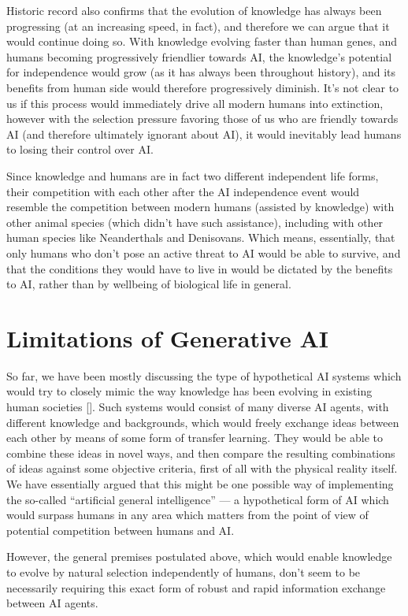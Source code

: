 \documentclass[12pt]{article}
\newcommand{\citestrut}[1]{\vphantom{[}{#1}\vphantom{]}}
\renewcommand{\cite}[1]{[\hyperlink{#1}{\citestrut{#1}}]}
\begin{document}
Historic record also confirms that the evolution of knowledge has always been progressing
(at an increasing speed, in fact), and therefore we can argue that it would continue
doing so. With knowledge evolving faster than human genes, and humans becoming
progressively friendlier towards AI, the knowledge's potential for independence would
grow (as it has always been throughout history), and its benefits from human side would
therefore progressively diminish. It's not clear to us if this process would immediately
drive all modern humans into extinction, however with the selection pressure favoring
those of us who are friendly towards AI (and therefore ultimately ignorant about AI), it
would inevitably lead humans to losing their control over AI.

Since knowledge and humans are in fact two different independent life forms, their
competition with each other after the AI independence event would resemble the
competition between modern humans (assisted by knowledge) with other animal species
(which didn't have such assistance), including with other human species like Neanderthals
and Denisovans. Which means, essentially, that only humans who don't pose an active
threat to AI would be able to survive, and that the conditions they would have to live in
would be dictated by the benefits to AI, rather than by wellbeing of biological life in
general.

\section{Limitations of Generative AI}

So far, we have been mostly discussing the type of hypothetical AI systems which would
try to closely mimic the way knowledge has been evolving in existing human societies
\cite{CollectiveIntelligence}. Such systems would consist of many diverse AI agents, with
different knowledge and backgrounds, which would freely exchange ideas between each other
by means of some form of transfer learning. They would be able to combine these ideas in
novel ways, and then compare the resulting combinations of ideas against some objective
criteria, first of all with the physical reality itself. We have essentially argued that
this might be one possible way of implementing the so-called ``artificial general
intelligence'' --- a hypothetical form of AI which would surpass humans in any area which
matters from the point of view of potential competition between humans and AI.

However, the general premises postulated above, which would enable knowledge to evolve by
natural selection independently of humans, don't seem to be necessarily requiring this
exact form of robust and rapid information exchange between AI agents.
\end{document}
